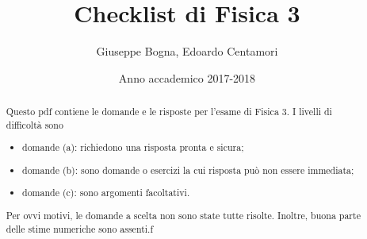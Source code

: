 \documentclass{article}
\title{Checklist di Fisica 3}
\author{Giuseppe Bogna, Edoardo Centamori}
\date{Anno accademico 2017-2018}
\renewcommand{\a}{(a)}
\renewcommand{\b}{(b)}
\renewcommand{\c}{(c)}
\begin{document}
	\maketitle
	
	\begin{abstract}
		Questo pdf contiene le domande e le risposte per l'esame di Fisica 3. I livelli di difficoltà sono\begin{itemize}
			\item domande \a : richiedono una risposta pronta e sicura;
			\item domande \b : sono domande o esercizi la cui risposta può non essere immediata;
			\item domande \c : sono argomenti facoltativi.
		\end{itemize}
		Per ovvi motivi, le domande a scelta non sono state tutte risolte. Inoltre, buona parte delle stime numeriche sono assenti.f
	\end{abstract}

\tableofcontents
\end{document}
